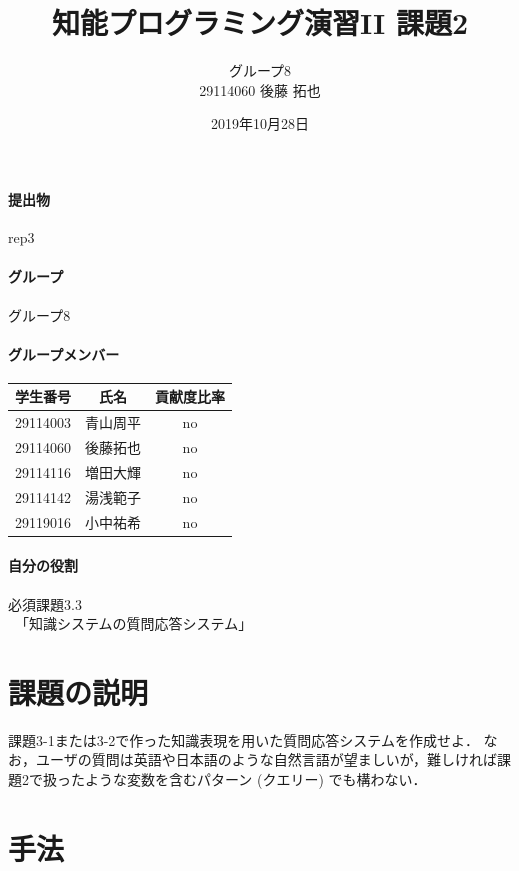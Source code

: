 ﻿\documentclass[uplatex,12pt]{jsarticle}
\title{知能プログラミング演習II 課題2}
\author{グループ8\\
  29114060 後藤 拓也\\
}
\date{2019年10月28日}
\begin{document}
\maketitle

\paragraph{提出物} rep3

\paragraph{グループ} グループ8

\paragraph{グループメンバー}
\begin{center}
\begin{tabular}{|c|c|c|}
  \hline
  学生番号&氏名&貢献度比率\\
  \hline\hline
  29114003&青山周平&no\\
  \hline
  29114060&後藤拓也&no\\
  \hline
  29114116&増田大輝&no\\
  \hline
  29114142&湯浅範子&no\\
  \hline
  29119016&小中祐希&no\\
  \hline
\end{tabular}
\end{center}
\paragraph{自分の役割} 必須課題3.3
\\　「知識システムの質問応答システム」
\section{課題の説明}
\begin{screen}
課題3-1または3-2で作った知識表現を用いた質問応答システムを作成せよ．
なお，ユーザの質問は英語や日本語のような自然言語が望ましいが，難しければ課題2で扱ったような変数を含むパターン (クエリー) でも構わない．
\end{screen}

\section{手法}
\end{document}
